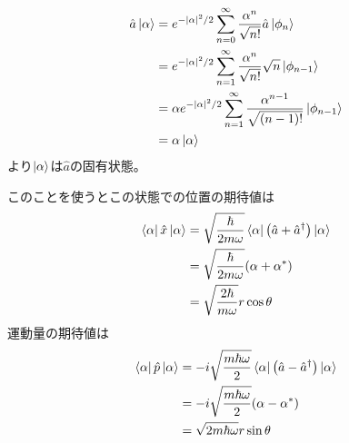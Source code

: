 \documentclass[../../master.tex]{subfiles}
\begin{document}
\subsection{}
\begin{equation}\begin{aligned}[b]
    \hat{a}\ket{\alpha}
    &= e^{-\abs{\alpha}^2/2}\sum_{n=0}^\infty\frac{\alpha^n}{\sqrt{n!}}\hat{a}\ket{\phi_n}\\
    &= e^{-\abs{\alpha}^2/2}\sum_{n=1}^\infty\frac{\alpha^n}{\sqrt{n!}}\sqrt{n}\ket{\phi_{n-1}}\\
    &= \alpha e^{-\abs{\alpha}^2/2}\sum_{n=1}^\infty\frac{\alpha^{n-1}}{\sqrt{(n-1)!}}\ket{\phi_{n-1}}\\
    &= \alpha\ket{\alpha}
\end{aligned}\end{equation}
より\(\ket{\alpha}\)は\(\hat{a}\)の固有状態。

このことを使うとこの状態での位置の期待値は
\begin{equation}\begin{aligned}[b]
    \bra{\alpha}\hat{x}\ket{\alpha}
    &= \sqrt{\frac{\hbar}{2m\omega}}\bra{\alpha}\qty(\hat{a}+\hat{a}^\dagger)\ket{\alpha}\\
    &=\sqrt{\frac{\hbar}{2m\omega}}\qty(\alpha+\alpha^*)\\
    &= \sqrt{\frac{2\hbar}{m\omega}}r\cos\theta
\end{aligned}\end{equation}
運動量の期待値は
\begin{equation}\begin{aligned}[b]
    \bra{\alpha}\hat{p}\ket{\alpha}
    &= -i\sqrt{\frac{m\hbar\omega}{2}}\bra{\alpha}\qty(\hat{a}-\hat{a}^\dagger)\ket{\alpha}\\
    &= -i\sqrt{\frac{m\hbar\omega}{2}}\qty(\alpha-\alpha^*)\\
    &= \sqrt{2m\hbar\omega}r\sin\theta
\end{aligned}\end{equation}
\end{document}
